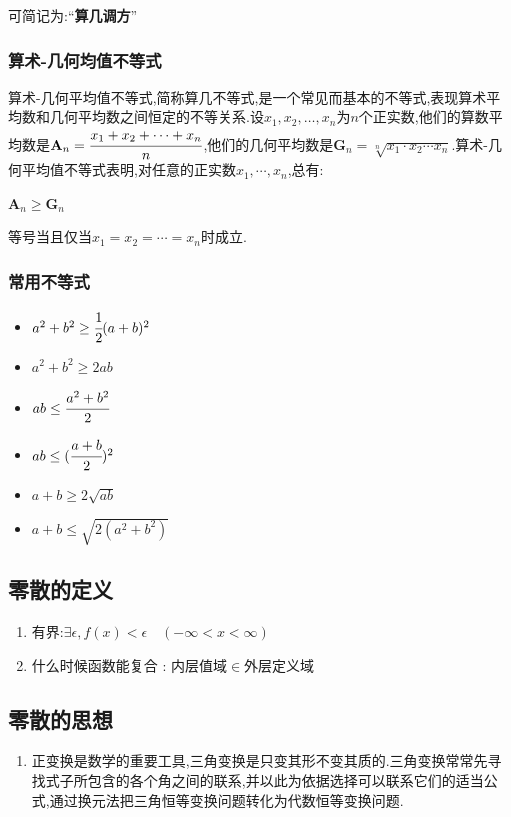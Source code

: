 \documentclass[UTF8,12pt]{ctexbook}
\begin{document}
{{{{可简记为:“{\bfseries 算几调方}”
}%

\subsubsection{算术-几何均值不等式}{
  算术-几何平均值不等式,简称算几不等式,是一个常见而基本的不等式,表现算术平均数和几何平均数之间恒定的不等关系.设$x_1,x_2,\dots,x_n$为$n$个正实数,他们的算数平均数是$\mathbf{A}_n = \cfrac{x_1 + x_2 + \dotsm + x_n}{n}$,他们的几何平均数是$\mathbf{G}_n = \sqrt[n]{x_1\cdot x_2 \dotsm x_n}$.算术-几何平均值不等式表明,对任意的正实数$x_1,\dotsm,x_n$,总有:

  \begin{center}
    $\mathbf{A}_n\geq\mathbf{G}_n$
  \end{center}

  等号当且仅当$x_1 = x_2 = \dotsm = x_n$时成立.

}%

\subsubsection{常用不等式}{
  \begin{itemize}
    \item $a^2 + b^2 \geq \cfrac{1}{2}(a + b)^2$
    \item $a^2 + b^2 \geq 2ab$
    \item $ab \leq \cfrac{a^2 + b^2}{2}$
    \item $ab \leq (\cfrac{a + b}{2})^2$
    \item $a + b \geq 2\sqrt{ab}$
    \item $a + b \leq \sqrt{2(a^2 + b^2)}$
  \end{itemize}
}%

}%

\subsection{零散的定义}{
  \begin{enumerate}
    \item 有界:$\exists\epsilon,f(x) < \epsilon\quad(-\infty < x < \infty )$
    \item 什么时候函数能复合 : 内层值域$\in$外层定义域
  \end{enumerate}
}%

\subsection{零散的思想}{
  \begin{enumerate}
    \item 正变换是数学的重要工具,三角变换是只变其形不变其质的.三角变换常常先寻找式子所包含的各个角之间的联系,并以此为依据选择可以联系它们的适当公式,通过换元法把三角恒等变换问题转化为代数恒等变换问题.
  \end{enumerate}
}%

}}
\end{document}
